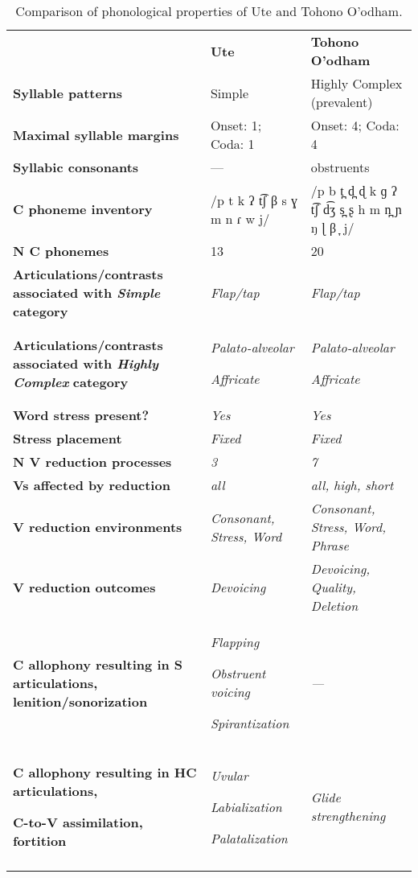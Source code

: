 \begin{table}
\begin{tabularx}{\textwidth}{XXX}
\lsptoprule
 & \textbf{Ute} & \textbf{Tohono O’odham}\\
 \textbf{Syllable patterns} & Simple & Highly Complex (prevalent)\\
 \textbf{Maximal syllable margins} & Onset: 1; Coda: 1 & Onset: 4; Coda: 4\\
 \textbf{Syllabic consonants} & — & obstruents\\
 \textbf{C phoneme inventory} & /p t k ʔ t͡ʃ β s ɣ m n ɾ w j/ & /p b t̪ d̪ ɖ k ɡ ʔ t͡ʃ d͡ʒ s̪ ʂ h m n̪ ɲ ŋ ɭ β ̞ j/\\
 \textbf{N C phonemes} & 13 & 20\\
 \textbf{Articulations/contrasts associated with \textit{Simple}} \textbf{category} & \textit{Flap/tap} & \textit{Flap/tap}\\
 \textbf{Articulations/contrasts associated with \textit{Highly Complex}} \textbf{category} & { \textit{Palato-alveolar}}

 \textit{Affricate} & { \textit{Palato-alveolar}}

 \textit{Affricate}\\
 \textbf{Word stress present?} & \textit{Yes} & \textit{Yes}\\
 \textbf{Stress placement} & \textit{Fixed} & \textit{Fixed}\\
 \textbf{N V reduction processes} & \textit{3} & \textit{7}\\
 \textbf{Vs affected by reduction}  & \textit{all} & \textit{all, high, short}\\
 \textbf{V reduction environments} & \textit{Consonant, Stress, Word} & \textit{Consonant, Stress, Word, Phrase}\\
 \textbf{V reduction outcomes} & \textit{Devoicing} & \textit{Devoicing, Quality, Deletion}\\
 \textbf{C allophony resulting in S articulations, lenition/sonorization} & { \textit{Flapping}}

{ \textit{Obstruent voicing}}

 \textit{Spirantization} & \textit{—}\\
{ \textbf{C allophony resulting in HC articulations,} }

 \textbf{C-to-V assimilation, fortition} & { \textit{Uvular}}

{ \textit{Labialization}}

 \textit{Palatalization} & \textit{Glide strengthening}\\
\lspbottomrule
\end{tabularx}
\caption{\label{tab:8.2}Comparison of phonological properties of Ute and Tohono O’odham.}
\end{table}

